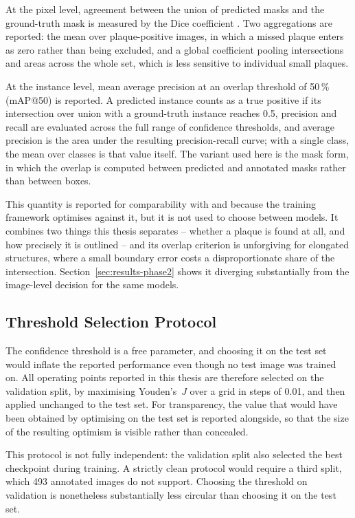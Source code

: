 At the pixel level, agreement between the union of predicted masks and the ground-truth mask is
measured by the Dice coefficient \cite{dice1945measures}. Two aggregations are reported: the mean
over plaque-positive images, in which a missed plaque enters as zero rather than being excluded,
and a global coefficient pooling intersections and areas across the whole set, which is less
sensitive to individual small plaques.

At the instance level, mean average precision at an overlap threshold of 50\,\% (mAP@50) is
reported. A predicted instance counts as a true positive if its intersection over union with a
ground-truth instance reaches 0.5, precision and recall are evaluated across the full range of
confidence thresholds, and average precision is the area under the resulting precision-recall
curve; with a single class, the mean over classes is that value itself. The variant used here is
the mask form, in which the overlap is computed between predicted and annotated masks rather than
between boxes.

This quantity is reported for comparability with \textcite{omarov2024deep} and because the
training framework optimises against it, but it is not used to choose between models. It combines
two things this thesis separates -- whether a plaque is found at all, and how precisely it is
outlined -- and its overlap criterion is unforgiving for elongated structures, where a small
boundary error costs a disproportionate share of the intersection. Section~\ref{sec:results-phase2}
shows it diverging substantially from the image-level decision for the same models.

\subsection{Threshold Selection Protocol}
\label{subsec:threshold-protocol}
The confidence threshold is a free parameter, and choosing it on the test set would inflate the
reported performance even though no test image was trained on. All operating points reported in
this thesis are therefore selected on the validation split, by maximising Youden's~$J$ over a grid
in steps of 0.01, and then applied unchanged to the test set. For transparency, the value that
would have been obtained by optimising on the test set is reported alongside, so that the size of
the resulting optimism is visible rather than concealed.

This protocol is not fully independent: the validation split also selected the best checkpoint
during training. A strictly clean protocol would require a third split, which 493 annotated images
do not support. Choosing the threshold on validation is nonetheless substantially less circular
than choosing it on the test set.

